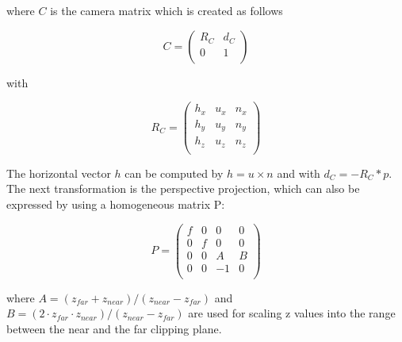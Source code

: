 where $C$ is the camera matrix which is created as follows

\begin{equation}
C = \left(\begin{array}{cc}
  R_C & d_C\\
  0 & 1\\
  \end{array}\right)
\end{equation}


with

\begin{equation}
R_C = \left(\begin{array}{ccc}
  h_x & u_x & n_x \\
  h_y & u_y & n_y \\
  h_z & u_z & n_z \\
  \end{array}\right)
\end{equation}

The horizontal vector $h$ can be computed by $h=u\times{}n$ and with $d_C=-R_C*p$.\\
The next transformation is the perspective projection, which can also be expressed by using a homogeneous matrix P:

\begin{equation}
P = \left(\begin{array}{cccc}
  f & 0 & 0 & 0\\
  0 & f & 0 & 0\\
  0 & 0 & A & B\\
  0 & 0 & -1 & 0\\
  \end{array}\right)
\end{equation}

where $A=(z_{far}+z_{near})/(z_{near}-z_{far})$ and $B = (2 \cdot{}z_{far} \cdot{}z_{near})/(z_{near}-z_{far})$ are used for scaling z values into the
range between the near and the far clipping plane.






